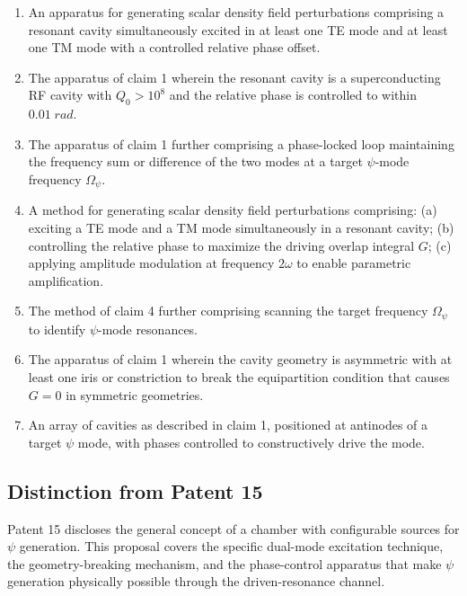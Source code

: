 \documentclass[11pt,a4paper]{article}
\begin{document}
\begin{enumerate}
\item An apparatus for generating scalar density field
perturbations comprising a resonant cavity simultaneously
excited in at least one TE mode and at least one TM mode
with a controlled relative phase offset.

\item The apparatus of claim 1 wherein the resonant cavity
is a superconducting RF cavity with $Q_0 > 10^8$ and the
relative phase is controlled to within $0.01\;\si{rad}$.

\item The apparatus of claim 1 further comprising a
phase-locked loop maintaining the frequency sum or
difference of the two modes at a target $\psi$-mode
frequency $\Omega_\psi$.

\item A method for generating scalar density field perturbations
comprising: (a) exciting a TE mode and a TM mode simultaneously
in a resonant cavity; (b) controlling the relative phase to
maximize the driving overlap integral $G$; (c) applying
amplitude modulation at frequency $2\omega$ to enable
parametric amplification.

\item The method of claim 4 further comprising scanning the
target frequency $\Omega_\psi$ to identify $\psi$-mode
resonances.

\item The apparatus of claim 1 wherein the cavity geometry
is asymmetric with at least one iris or constriction to break
the equipartition condition that causes $G = 0$ in symmetric
geometries.

\item An array of cavities as described in claim 1, positioned
at antinodes of a target $\psi$ mode, with phases controlled
to constructively drive the mode.
\end{enumerate}

\subsection{Distinction from Patent 15}

Patent 15 discloses the general concept of a chamber with
configurable sources for $\psi$ generation.  This proposal
covers the specific dual-mode excitation technique, the
geometry-breaking mechanism, and the phase-control apparatus
that make $\psi$ generation physically possible through the
driven-resonance channel.
\end{document}
